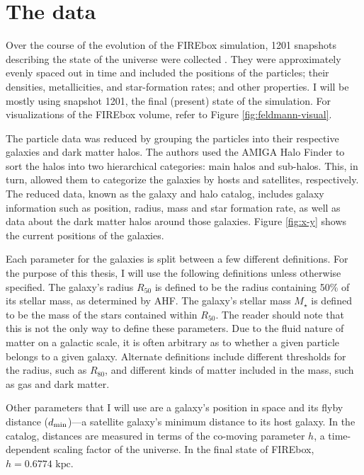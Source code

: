 \section{The data}
Over the course of the evolution of the FIREbox simulation, 1201 snapshots describing the state of the universe were collected \citep{feldmannFIREboxSimulatingGalaxies2022}. They were approximately evenly spaced out in time and included the positions of the particles; their densities, metallicities, and star-formation rates; and other properties. I will be mostly using snapshot 1201, the final (present) state of the simulation. For visualizations of the FIREbox volume, refer to Figure \ref{fig:feldmann-visual}.

The particle data was reduced by grouping the particles into their respective galaxies and dark matter halos. The authors used the AMIGA Halo Finder \citep[AHF;][]{knollmannAhfAMIGAHALO2009} to sort the halos into two hierarchical categories: main halos and sub-halos. This, in turn, allowed them to categorize the galaxies by hosts and satellites, respectively. The reduced data, known as the galaxy and halo catalog, includes galaxy information such as position, radius, mass and star formation rate, as well as data about the dark matter halos around those galaxies. Figure \ref{fig:x-y} shows the current positions of the galaxies. 

Each parameter for the galaxies is split between a few different definitions. For the purpose of this thesis, I will use the following definitions unless otherwise specified. The galaxy's radius $R_{50}$ is defined to be the radius containing 50\% of its stellar mass, as determined by AHF. The galaxy's stellar mass $M_\star$ is defined to be the mass of the stars contained within $R_{50}$. The reader should note that this is not the only way to define these parameters. Due to the fluid nature of matter on a galactic scale, it is often arbitrary as to whether a given particle belongs to a given galaxy. Alternate definitions include different thresholds for the radius, such as $R_{80}$, and different kinds of matter included in the mass, such as gas and dark matter.

Other parameters that I will use are a galaxy's position in space and its flyby distance ($d_{\rm{min}}$)---a satellite galaxy's minimum distance to its host galaxy. In the catalog, distances are measured in terms of the co-moving parameter $h$, a time-dependent scaling factor of the universe. In the final state of FIREbox, $h = 0.6774 \text{ kpc}$. 

